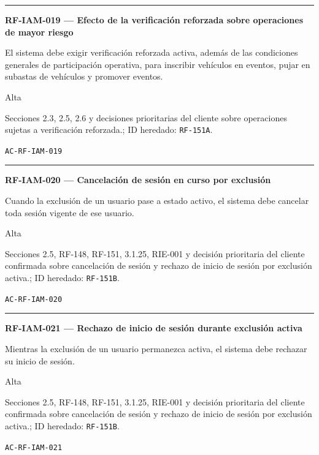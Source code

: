 \documentclass[10pt,letterpaper]{article}
\begin{document}
\vspace{0.25em}\hrule\vspace{0.65em}
\noindent\textbf{RF-IAM-019 --- Efecto de la verificación reforzada sobre operaciones de mayor riesgo}\par
\begin{description}[style=nextline,leftmargin=3.15cm,labelwidth=2.8cm,font=\normalfont\bfseries]
\item[Obligación] El sistema debe exigir verificación reforzada activa, además de las condiciones generales de participación operativa, para inscribir vehículos en eventos, pujar en subastas de vehículos y promover eventos.
\item[Prioridad] Alta
\item[Procedencia] Secciones 2.3, 2.5, 2.6 y decisiones prioritarias del cliente sobre operaciones sujetas a verificación reforzada.; ID heredado: \texttt{RF-151A}.
\item[Verificación] \texttt{AC-RF-IAM-019}
\end{description}
\vspace{0.25em}\hrule\vspace{0.65em}
\noindent\textbf{RF-IAM-020 --- Cancelación de sesión en curso por exclusión}\par
\begin{description}[style=nextline,leftmargin=3.15cm,labelwidth=2.8cm,font=\normalfont\bfseries]
\item[Obligación] Cuando la exclusión de un usuario pase a estado activo, el sistema debe cancelar toda sesión vigente de ese usuario.
\item[Prioridad] Alta
\item[Procedencia] Secciones 2.5, RF-148, RF-151, 3.1.25, RIE-001 y decisión prioritaria del cliente confirmada sobre cancelación de sesión y rechazo de inicio de sesión por exclusión activa.; ID heredado: \texttt{RF-151B}.
\item[Verificación] \texttt{AC-RF-IAM-020}
\end{description}
\vspace{0.25em}\hrule\vspace{0.65em}
\noindent\textbf{RF-IAM-021 --- Rechazo de inicio de sesión durante exclusión activa}\par
\begin{description}[style=nextline,leftmargin=3.15cm,labelwidth=2.8cm,font=\normalfont\bfseries]
\item[Obligación] Mientras la exclusión de un usuario permanezca activa, el sistema debe rechazar su inicio de sesión.
\item[Prioridad] Alta
\item[Procedencia] Secciones 2.5, RF-148, RF-151, 3.1.25, RIE-001 y decisión prioritaria del cliente confirmada sobre cancelación de sesión y rechazo de inicio de sesión por exclusión activa.; ID heredado: \texttt{RF-151B}.
\item[Verificación] \texttt{AC-RF-IAM-021}
\end{description}
\end{document}
